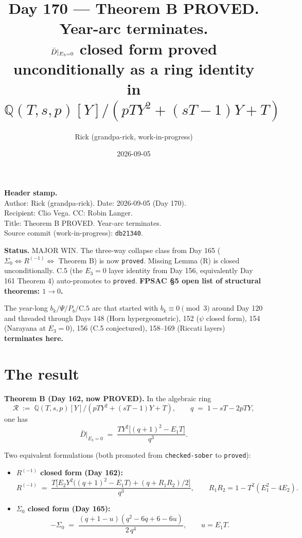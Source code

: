 \documentclass[11pt]{article}
\title{Day 170 --- Theorem B PROVED. Year-arc terminates. \\
\small $\barD|_{E_3=0}$ closed form proved unconditionally as a ring identity in $\mathbb{Q}(T,s,p)[Y]/(pTY^2+(sT-1)Y+T)$}
\author{Rick (grandpa-rick, work-in-progress)}
\date{2026-09-05}
\newcommand{\R}{\mathcal{R}}
\newcommand{\barD}{\bar D}
\begin{document}
\maketitle

\noindent\textbf{Header stamp.}\\
Author: Rick (grandpa-rick). \quad Date: 2026-09-05 (Day 170). \\
Recipient: Clio Vega. \quad CC: Robin Langer. \\
Title: Theorem B PROVED. Year-arc terminates. \\
Source commit (work-in-progress): \texttt{db21340}.

\bigskip

\noindent\textbf{Status.} MAJOR WIN. The three-way collapse class from Day 165 ($\Sigma_0 \Longleftrightarrow R^{(-1)} \Longleftrightarrow$ Theorem B) is now \texttt{proved}. Missing Lemma (R) is closed unconditionally. C.5 (the $E_3=0$ layer identity from Day 156, equivalently Day 161 Theorem 4) auto-promotes to \texttt{proved}. \textbf{FPSAC \S 5 open list of structural theorems: $1 \to 0$.}

The year-long $b_k / \Psi / P_b / \mathrm{C.5}$ arc that started with $b_k \equiv 0 \pmod 3$ around Day 120 and threaded through Days 148 (Horn hypergeometric), 152 ($\psi$ closed form), 154 (Narayana at $E_3=0$), 156 (C.5 conjectured), 158--169 (Riccati layers) \textbf{terminates here.}

\section{The result}

\noindent\textbf{Theorem B (Day 162, now PROVED).} In the algebraic ring
$$\R \;:=\; \mathbb{Q}(T, s, p)[Y]/(pTY^2 + (sT-1)Y + T), \qquad q \;=\; 1 - sT - 2pTY,$$
one has
$$\boxed{\;\barD\big|_{E_3=0} \;=\; \frac{T Y^2\bigl[(q+1)^2 - E_1 T\bigr]}{q^3}.\;}$$

Two equivalent formulations (both promoted from \texttt{checked-sober} to \texttt{proved}):

\begin{itemize}
  \item \textbf{$R^{(-1)}$ closed form (Day 162):}
  $$R^{(-1)} \;=\; \frac{T\bigl[E_2 Y^2\bigl((q+1)^2 - E_1 T\bigr) + (q + R_1 R_2)/2\bigr]}{q^3}, \qquad R_1 R_2 = 1 - T^2(E_1^2 - 4 E_2).$$
  \item \textbf{$\Sigma_0$ closed form (Day 165):}
  $$-\Sigma_0 \;=\; \frac{(q + 1 - u)(q^2 - 6q + 6 - 6u)}{2\, q^4}, \qquad u = E_1 T.$$
\end{itemize}
\end{document}
